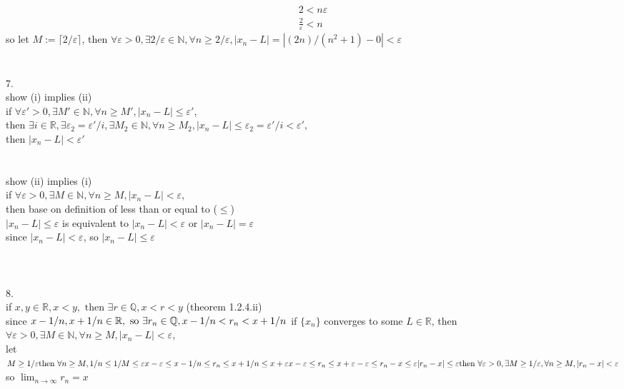 \documentclass[12pt, border = 4pt, multi]{article} %
\begin{document}
\begin{align*}
2 < n\varepsilon\\
\frac{2}{\varepsilon} < n
\end{align*}
so let $M := \lceil 2 / \varepsilon \rceil$, then $\forall \varepsilon > 0, \exists 2 / \varepsilon \in \mathbb{N}, \forall n \geq 2 / \varepsilon, |x_n - L| = |(2n) / (n ^ 2 + 1) - 0| < \varepsilon$\\
\\
\\
7.\\
show (i) implies (ii)\\
if $\forall \varepsilon' > 0, \exists M' \in \mathbb{N}, \forall n \geq M', |x_n - L| \leq \varepsilon'$,\\
then $\exists i \in \mathbb{R}, \exists \varepsilon_2 = \varepsilon' / i, \exists M_2 \in \mathbb{N}, \forall n \geq M_2, |x_n - L| \leq \varepsilon_2 = \varepsilon' / i < \varepsilon'$,\\
then $|x_n - L| < \varepsilon'$\\
\\
\\
show (ii) implies (i)\\
if $\forall \varepsilon > 0, \exists M \in \mathbb{N}, \forall n \geq M, |x_n - L| < \varepsilon$,\\
then base on definition of less than or equal to ($\leq$)\\
$|x_n - L| \leq \varepsilon$ is equivalent to $|x_n - L| < \varepsilon$ or $|x_n - L| = \varepsilon$\\
since $|x_n - L| < \varepsilon$, so $|x_n - L| \leq \varepsilon$\\
\\
\\
\\
8.\\
if $x, y \in \mathbb{R}, x < y, \text{ then } \exists r \in \mathbb{Q}, x < r < y$ \qquad (theorem 1.2.4.ii)\\
since $x - 1 / n, x + 1 / n \in \mathbb{R}, \text{ so } \exists r_n \in \mathbb{Q}, x - 1 / n < r_n < x + 1 / n\\$
if $\{x_n\}$ converges to some $L \in \mathbb{R}$, then $\forall \varepsilon > 0, \exists M \in \mathbb{N}, \forall n \geq M, |x_n - L| < \varepsilon$,\\
let $M \geq 1 / \varepsilon\\
\text{then } \forall n \geq M, 1 / n \leq 1 / M \leq \varepsilon\\
x - \varepsilon \leq x - 1 / n \leq r_n \leq x + 1 / n \leq x + \varepsilon\\
x - \varepsilon \leq r_n \leq x + \varepsilon\\
-\varepsilon \leq r_n - x \leq \varepsilon\\
|r_n - x| \leq \varepsilon\\
\text{then }\forall \varepsilon > 0, \exists M \geq 1 / \varepsilon, \forall n \geq M, |r_n - x| < \varepsilon$\\
so $\lim_{n \rightarrow \infty} r_n = x$\\
\end{document}
